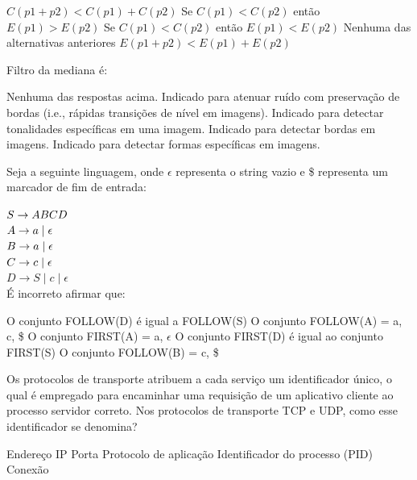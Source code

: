 \documentclass[12pt, addpoints]{exam}
\begin{document}
\begin{questions}
\begin{choices}
\choice \( C(p1 + p2) < C(p1) + C(p2) \)
\choice Se \( C(p1) < C(p2) \) então \( E(p1) > E(p2) \)
\choice Se \( C(p1) < C(p2) \) então \( E(p1) < E(p2) \)
\choice Nenhuma das alternativas anteriores
\choice \( E(p1 + p2) < E(p1) + E(p2) \)
\end{choices}

\question

Filtro da mediana é:
\begin{choices}
\choice Nenhuma das respostas acima.
\choice Indicado para atenuar ruído com preservação de bordas (i.e., rápidas transições de nível em imagens).
\choice Indicado para detectar tonalidades específicas em uma imagem.
\choice Indicado para detectar bordas em imagens.
\choice Indicado para detectar formas específicas em imagens.
\end{choices}

\question

Seja a seguinte linguagem, onde \(\epsilon\) representa o string vazio e \$ representa um marcador de fim de entrada:



$S \rightarrow ABCD \\$\\

$A \rightarrow a \mid \epsilon \\$\\

$B \rightarrow a \mid \epsilon \\$\\

$C \rightarrow c \mid \epsilon \\$\\

$D \rightarrow S \mid c \mid \epsilon$\\



É incorreto afirmar que:
\begin{choices}
\choice O conjunto FOLLOW(D) é igual a FOLLOW(S)
\choice O conjunto FOLLOW(A) = a, c, \$
\choice O conjunto FIRST(A) = a, \(\epsilon\)
\choice O conjunto FIRST(D) é igual ao conjunto FIRST(S)
\choice O conjunto FOLLOW(B) = c, \$
\end{choices}

\question

Os protocolos de transporte atribuem a cada serviço um identificador único, o qual é empregado para encaminhar uma requisição de um aplicativo cliente ao processo servidor correto. Nos protocolos de transporte TCP e UDP, como esse identificador se denomina?
\begin{choices}
\choice Endereço IP
\choice Porta
\choice Protocolo de aplicação
\choice Identificador do processo (PID)
\choice Conexão
\end{choices}


\end{questions}
\end{document}
